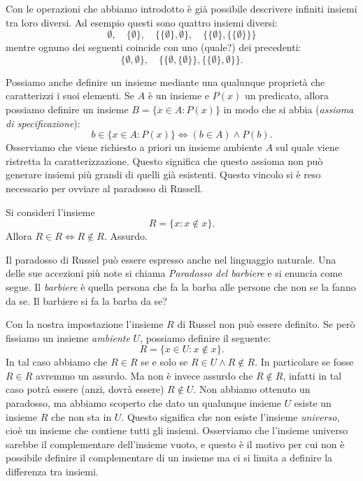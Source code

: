 \documentclass[italian,a4paper,hidelinks]{scrartcl}
\newcommand{\myemph}[1]{\emph{#1}\marginpar{#1}}
\begin{document}
Con le operazioni che abbiamo introdotto è già possibile descrivere infiniti insiemi
tra loro diversi. Ad esempio questi sono quattro insiemi diversi:
\[
 \emptyset,\quad
 \{ \emptyset \},\quad
 \{\{\emptyset\}, \emptyset\},\quad
 \{\{\emptyset\}, \{\{\emptyset\}\}\}
\]
mentre ognuno dei seguenti coincide con uno (quale?) dei precedenti:
\[
 \{\emptyset, \emptyset\},\quad
 \{\{\emptyset, \{\emptyset\}\}, \{\{\emptyset\}, \emptyset\}\}.
\]

Possiamo anche definire un insieme mediante una qualunque
proprietà che caratterizzi
i suoi elementi. Se $A$ è un insieme e $P(x)$ un predicato, allora
possiamo definire un insieme $B = \{x\in A\colon P(x)\}$ in modo
che si abbia
(\myemph{assioma di specificazione}):
\[
  b \in \{x\in A \colon P(x)\} \iff (b \in A) \wedge P(b).
\]
Osserviamo che viene richiesto a priori un insieme ambiente $A$ sul quale
viene ristretta la caratterizzazione. Questo significa che questo assioma non
può generare insiemi più grandi di quelli già esistenti.
Questo vincolo si è reso necessario per ovviare al paradosso di Russell.

\begin{paradox}[Russel]
Si consideri l'insieme
\[
  R = \{ x\colon x \not\in x\}.
\]
Allora $R\in R \iff R\not \in R$. Assurdo.
\end{paradox}

Il paradosso di Russel può essere espresso anche nel linguaggio naturale.
Una delle sue accezioni più note si chiama \emph{Paradosso del barbiere}
e si enuncia come segue. Il \emph{barbiere} è quella persona che fa la barba
alle persone che non se la fanno da se. Il barbiere si fa la barba da se?

Con la nostra impostazione l'insieme $R$ di Russel non può essere definito.
Se però fissiamo un insieme \emph{ambiente} $U$, possiamo definire il seguente:
\[
  R = \{ x \in U \colon x \not \in x\}.
\]
In tal caso abbiamo che $R\in R$ se e solo se $R\in U \wedge R\not \in R$.
In particolare se fosse $R\in R$ avremmo un assurdo. Ma non è invece
assurdo che $R\not \in R$, infatti in tal caso potrà essere (anzi, dovrà essere)
$R\not \in U$.
Non abbiamo ottenuto un paradosso, ma abbiamo scoperto che dato
un qualunque insieme $U$ esiste un insieme $R$ che non sta in $U$.
Questo significa che non esiste l'insieme \myemph{universo}, cioè un insieme che
contiene tutti gli insiemi. Osserviamo che l'insieme universo sarebbe il complementare
dell'insieme vuoto, e questo è il motivo per cui non è possibile definire
il complementare di un insieme ma ci si limita a definire la differenza tra insiemi.
\end{document}
